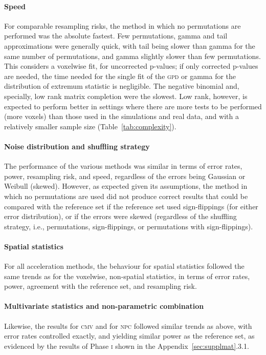 \paragraph{Speed} For comparable resampling risks, the method in which no permutations are performed was the absolute fastest. Few permutations, gamma and tail approximations were generally quick, with tail being slower than gamma for the same number of permutations, and gamma slightly slower than few permutations. This considers a voxelwise fit, for uncorrected p-values; if only corrected p-values are needed, the time needed for the single fit of the \textsc{gpd} or gamma for the distribution of extremum statistic is negligible. The negative binomial and, specially, low rank matrix completion were the slowest. Low rank, however, is expected to perform better in settings where there are more tests to be performed (more voxels) than those used in the simulations and real data, and with a relatively smaller sample size (Table~\ref{tab:complexity}).

\paragraph{Noise distribution and shuffling strategy} The performance of the various methods was similar in terms of error rates, power, resampling risk, and speed, regardless of the errors being Gaussian or Weibull (skewed). However, as expected given its assumptions, the method in which no permutations are used did not produce correct results that could be compared with the reference set if the reference set used sign-flippings (for either error distribution), or if the errors were skewed (regardless of the shuffling strategy, i.e., permutations, sign-flippings, or permutations with sign-flippings).

\paragraph{Spatial statistics} For all acceleration methods, the behaviour for spatial statistics followed the same trends as for the voxelwise, non-spatial statistics, in terms of error rates, power, agreement with the reference set, and resampling risk.

\paragraph{Multivariate statistics and non-parametric combination} Likewise, the results for \textsc{cmv} and for \textsc{npc} followed similar trends as above, with error rates controlled exactly, and yielding similar power as the reference set, as evidenced by the results of Phase \textsc{i} shown in the Appendix~\ref{sec:supplmat}.3.1.

